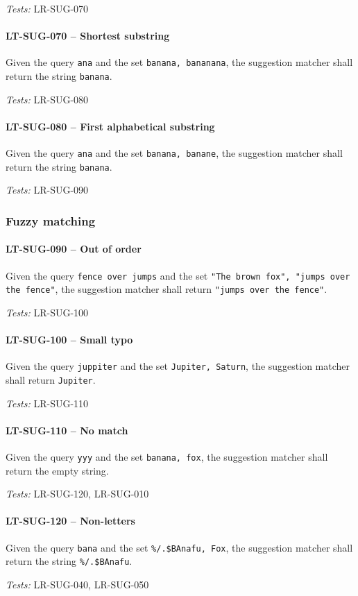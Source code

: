 \textit{Tests: } LR-SUG-070

\paragraph{LT-SUG-070 -- Shortest substring}
Given the query \lstinline{ana} and the set \lstinline{banana, bananana},
the suggestion matcher shall return the string \lstinline{banana}.

\textit{Tests: } LR-SUG-080

\paragraph{LT-SUG-080 -- First alphabetical substring}
Given the query \lstinline{ana} and the set \lstinline{banana, banane},
the suggestion matcher shall return the string \lstinline{banana}.

\textit{Tests: } LR-SUG-090

\subsubsection{Fuzzy matching}
\paragraph{LT-SUG-090 -- Out of order}
Given the query \lstinline{fence over jumps} and the set
\lstinline{"The brown fox", "jumps over the fence"}, the suggestion
matcher shall return \lstinline{"jumps over the fence"}.

\textit{Tests: } LR-SUG-100

\paragraph{LT-SUG-100 -- Small typo}
Given the query \lstinline{juppiter} and the set
\lstinline{Jupiter, Saturn}, the suggestion matcher shall return
\lstinline{Jupiter}.

\textit{Tests: } LR-SUG-110

\paragraph{LT-SUG-110 -- No match}
Given the query \lstinline{yyy} and the set
\lstinline{banana, fox}, the suggestion matcher shall return the
empty string.

\textit{Tests: } LR-SUG-120, LR-SUG-010

\paragraph{LT-SUG-120 -- Non-letters}
Given the query \lstinline{bana} and the set
\lstinline{%/.$BAnafu, Fox}, the suggestion matcher shall return
the string \lstinline{%/.$BAnafu}.

\textit{Tests: } LR-SUG-040, LR-SUG-050
